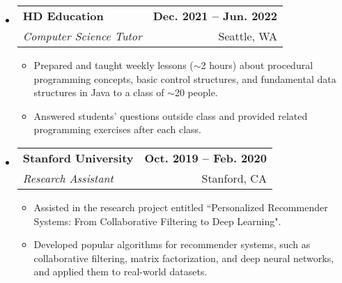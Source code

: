 \documentclass[letterpaper,11pt]{article}
\begin{document}
\begin{itemize}[nosep,label={},leftmargin=0in]
  \item
  \begin{tabularx}{\textwidth}{Xr@{}}
    \textbf{HD Education} & \textbf{Dec. 2021 -- Jun. 2022} \\
    \textit{Computer Science Tutor} & Seattle, WA
  \end{tabularx}
  \begin{itemize}[nosep]
    \item \small{Prepared and taught weekly lessons ($\sim$2 hours) about procedural programming concepts, basic control structures, and fundamental data structures in Java to a class of $\sim$20 people.}
    \item \small{Answered students’ questions outside class and provided related programming exercises after each class.}
  \end{itemize}

  \item
  \begin{tabularx}{\textwidth}{Xr@{}}
    \textbf{Stanford University} & \textbf{Oct. 2019 -- Feb. 2020} \\
    \textit{Research Assistant} & Stanford, CA
  \end{tabularx}
  \begin{itemize}[nosep]
    \item \small{Assisted in the research project entitled ``Personalized Recommender Systems: From Collaborative Filtering to Deep Learning".}
    \item \small{Developed popular algorithms for recommender systems, such as collaborative filtering, matrix factorization, and deep neural networks, and applied them to real-world datasets.}
  \end{itemize}

\end{itemize}


\end{document}
